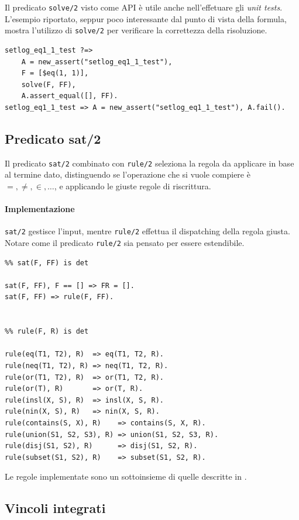 \documentclass[12pt,a4paper,openright]{book} %
\begin{document}
Il predicato \verb|solve/2| visto come API è utile anche
nell'effetuare gli \emph{unit tests}. L'esempio riportato, seppur poco
interessante dal punto di vista della formula, mostra l'utilizzo di
\verb|solve/2| per verificare la correttezza della risoluzione.
\begin{verbatim}
setlog_eq1_1_test ?=>
    A = new_assert("setlog_eq1_1_test"),
    F = [$eq(1, 1)],
    solve(F, FF),
    A.assert_equal([], FF).
setlog_eq1_1_test => A = new_assert("setlog_eq1_1_test"), A.fail().
\end{verbatim}

\subsection{Predicato sat/2}
\label{subsec:lsetpicat_solver_sat2}

Il predicato \verb|sat/2| combinato con \verb|rule/2| seleziona la
regola da applicare in base al termine dato, distinguendo se
l'operazione che si vuole compiere è $=, \neq, \in, \ldots$, e
applicando le giuste regole di riscrittura.

\paragraph{Implementazione}
\verb|sat/2| gestisce l'input, mentre \verb|rule/2| effettua il
dispatching della regola giusta. Notare come il predicato
\verb|rule/2| sia pensato per essere estendibile.
\begin{verbatim}
%% sat(F, FF) is det

sat(F, FF), F == [] => FR = [].
sat(F, FF) => rule(F, FF).


%% rule(F, R) is det

rule(eq(T1, T2), R)  => eq(T1, T2, R).
rule(neq(T1, T2), R) => neq(T1, T2, R).
rule(or(T1, T2), R)  => or(T1, T2, R).
rule(or(T), R)       => or(T, R).
rule(insl(X, S), R)  => insl(X, S, R).
rule(nin(X, S), R)   => nin(X, S, R).
rule(contains(S, X), R)    => contains(S, X, R).
rule(union(S1, S2, S3), R) => union(S1, S2, S3, R).
rule(disj(S1, S2), R)      => disj(S1, S2, R).
rule(subset(S1, S2), R)    => subset(S1, S2, R).
\end{verbatim}

Le regole implementate sono un sottoinsieme di quelle descritte in
\cite{Rossi18}.

\subsection{Vincoli integrati}
\label{subsec:lsetpicat_solver_rewriterules}
\end{document}
